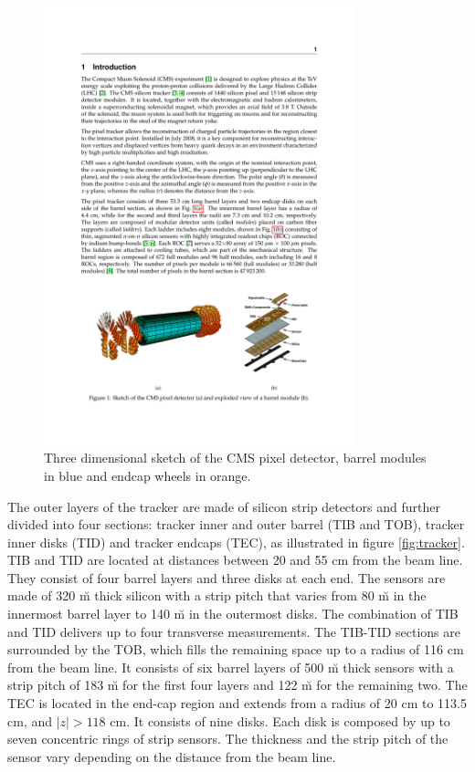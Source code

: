 \begin{figure}
\begin{center}
\includegraphics[angle=-0,width=0.8\textwidth]{2_LHC_and_CMS/pics/pixelfull.pdf}
\caption{Three dimensional sketch of the CMS pixel detector, barrel modules in blue and endcap wheels in orange.
\label{fig:pixel}
}
\end{center}
\end{figure}

The outer layers of the tracker are made of silicon strip detectors and further divided into four sections: tracker inner and outer barrel (TIB and TOB), tracker inner disks (TID) and tracker endcaps (TEC), as illustrated in figure \ref{fig:tracker}. TIB and TID are located at distances between 20 and 55 cm from the beam line. They consist of four barrel layers and three disks at each end. The sensors are made of 320 \u m thick silicon with a strip pitch that varies from 80 \u m in the innermost barrel layer to 140 \u m in the outermost disks. The combination of TIB and TID delivers up to four transverse measurements. The TIB-TID sections are surrounded by the TOB, which fills the remaining space up to a radius of 116 cm from the beam line. It consists of six barrel layers of 500 \u m thick sensors with a strip pitch of 183 \u m for the first four layers and 122 \u m for the remaining two. The TEC is located in the end-cap region and extends from a radius of 20 cm to 113.5 cm, and $|z| > 118$ cm. It consists of nine disks. Each disk is composed by up to seven concentric rings of strip sensors. The thickness and the strip pitch of the sensor vary depending on the distance from the beam line. 

